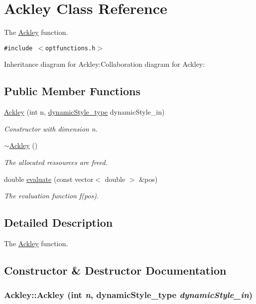 \hypertarget{classAckley}{
\section{Ackley Class Reference}
\label{classAckley}
}
The \hyperlink{classAckley}{Ackley} function.  


{\tt \#include $<$optfunctions.h$>$}

Inheritance diagram for Ackley:Collaboration diagram for Ackley:\subsection*{Public Member Functions}
\begin{CompactItemize}
\item 
\hyperlink{classAckley_92a07ab7c3d1cbc6914c20598d304e78}{Ackley} (int n, \hyperlink{optfunctions_8h_ae9aa3a5dd199a43e77abc2cccf4477e}{dynamicStyle\_\-type} dynamicStyle\_\-in)
\begin{CompactList}\small\item\em Constructor with dimension n. \item\end{CompactList}\item 
\hyperlink{classAckley_744516ce25ffab41b589b7d39a52c380}{$\sim$Ackley} ()
\begin{CompactList}\small\item\em The allocated ressources are freed. \item\end{CompactList}\item 
double \hyperlink{classAckley_bfd43046b591f73cf05527333220b5e2}{evaluate} (const vector$<$ double $>$ \&pos)
\begin{CompactList}\small\item\em The evaluation function f(pos). \item\end{CompactList}\end{CompactItemize}


\subsection{Detailed Description}
The \hyperlink{classAckley}{Ackley} function. 

\subsection{Constructor \& Destructor Documentation}
\hypertarget{classAckley_92a07ab7c3d1cbc6914c20598d304e78}{
\subsubsection{\setlength{\rightskip}{0pt plus 5cm}Ackley::Ackley (int {\em n}, \/  {\bf dynamicStyle\_\-type} {\em dynamicStyle\_\-in})}}
\label{classAckley_92a07ab7c3d1cbc6914c20598d304e78}



